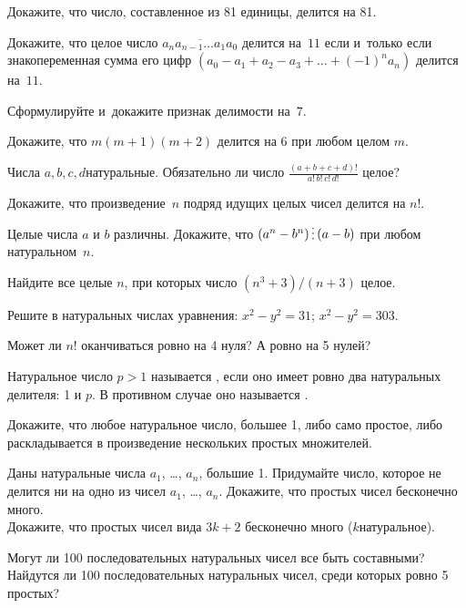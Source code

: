 \documentclass[a4paper,12pt]{article}
\begin{document}
Докажите, что число, составленное из 81 единицы, делится на 81.

Докажите, что целое число $\overline{a_na_{n-1}\dots a_1a_0}$ делится на~$11$ если и~только если знакопеременная сумма его цифр $(a_0-a_1+a_2-a_3+\ldots+(-1)^n a_n)$ делится на~$11$.

Сформулируйте и~докажите признак делимости на~$7$.

Докажите, что $m(m + 1)(m + 2)$ делится на 6 при любом целом $m$.

Числа $a,b,c,d$\т натуральные. Обязательно ли число $\displaystyle\frac{(a + b + c + d)!}{a!\,b!\,c!\,d!}$ целое?

Докажите, что произведение~$n$ подряд идущих целых чисел делится на $n!$.

Целые числа $a$ и $b$ различны. Докажите, что $(a^n - b^n) \dv (a - b)$ при любом натуральном~$n$.

Найдите все целые $n$, при которых число $(n^3 + 3)/(n + 3)$ целое.

Решите в натуральных числах уравнения:
$x^2 - y^2 = 31$;
$x^2 - y^2 = 303$.

Может ли $n!$ оканчиваться ровно на 4 нуля? А ровно на 5 нулей?

\vfill
{}
\newpage

 Натуральное число $p > 1$ называется , если оно имеет ровно два натуральных делителя: 1 и $p$. В противном случае оно называется .

Докажите, что любое натуральное число, большее 1, либо само простое, либо раскладывается в произведение нескольких простых множителей.

Даны натуральные числа $a_1$, \ldots, $a_n$, большие 1. Придумайте число, которое не делится ни на одно из чисел $a_1$, \ldots, $a_n$.
Докажите, что простых чисел бесконечно много.\\
Докажите, что простых чисел вида $3k + 2$ бесконечно много ($k$\т натуральное). 

Могут ли 100 последовательных натуральных чисел все быть составными? \\
Найдутся ли 100 последовательных натуральных чисел, среди которых ровно 5 простых?
\end{document}
